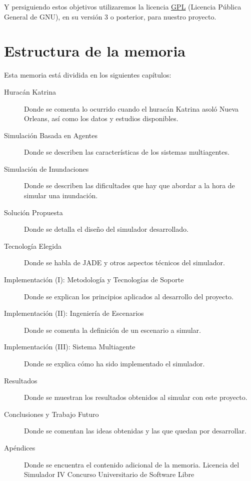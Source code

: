 Y persiguiendo estos objetivos utilizaremos la licencia \hyperref[ap1]{GPL}
(Licencia Pública General de GNU), en su versión 3 o posterior, para nuestro
proyecto.

\section{Estructura de la memoria}

Esta memoria está dividida en los siguientes capítulos:

\begin{description}
 \item[Huracán Katrina] Donde se comenta lo ocurrido cuando el huracán Katrina
 asoló Nueva Orleans, así como los datos y estudios disponibles.
 \item[Simulación Basada en Agentes] Donde se describen las características de
 los sistemas multiagentes.
 \item[Simulación de Inundaciones] Donde se describen las dificultades que hay
 que abordar a la hora de simular una inundación.
 \item[Solución Propuesta] Donde se detalla el diseño del simulador
 desarrollado.
 \item[Tecnología Elegida] Donde se habla de JADE y otros aspectos técnicos del
 simulador.
 \item[Implementación (I): Metodología y Tecnologías de Soporte] Donde se
 explican los principios aplicados al desarrollo del proyecto.
 \item[Implementación (II): Ingeniería de Escenarios] Donde se comenta la
 definición de un escenario a simular.
 \item[Implementación (III): Sistema Multiagente] Donde se explica cómo ha sido
 implementado el simulador.
 \item[Resultados] Donde se muestran los resultados obtenidos al simular con
 este proyecto.
 \item[Conclusiones y Trabajo Futuro] Donde se comentan las ideas obtenidas y
 las que quedan por desarrollar.
 \item[Apéndices] Donde se encuentra el contenido adicional de la memoria.
  \subitem Licencia del Simulador
  \subitem IV Concurso Universitario de Software Libre
\end{description}

